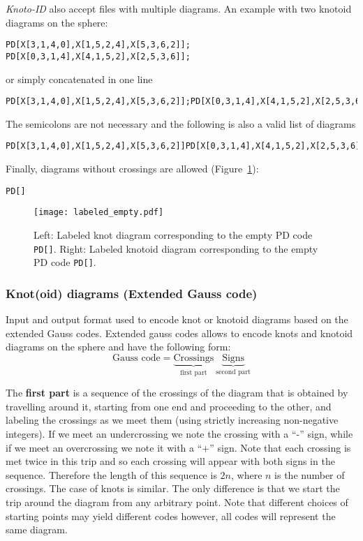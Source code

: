 {\it Knoto-ID} also accept files with multiple diagrams. An example with two knotoid diagrams on the sphere:
\begin{lstlisting}
PD[X[3,1,4,0],X[1,5,2,4],X[5,3,6,2]];
PD[X[0,3,1,4],X[4,1,5,2],X[2,5,3,6]];
\end{lstlisting}
or simply concatenated in one line
\begin{lstlisting}
PD[X[3,1,4,0],X[1,5,2,4],X[5,3,6,2]];PD[X[0,3,1,4],X[4,1,5,2],X[2,5,3,6]];
\end{lstlisting}

The semicolons are not necessary and the following is also a valid list of diagrams
\begin{lstlisting}
PD[X[3,1,4,0],X[1,5,2,4],X[5,3,6,2]]PD[X[0,3,1,4],X[4,1,5,2],X[2,5,3,6]]
\end{lstlisting}

Finally, diagrams without crossings are allowed (Figure~\ref{fig:labempty}):
\begin{lstlisting}
PD[]
\end{lstlisting}

\begin{figure}[t]
\centering
\texttt{[image: labeled\_empty.pdf]}
\caption{Left: Labeled knot diagram corresponding to the empty PD code \lstinline{PD[]}. Right: Labeled knotoid diagram corresponding to the empty PD code \lstinline{PD[]}.}\label{fig:labempty}
\end{figure}

\subsubsection{\label{sec:format:gauss}Knot(oid) diagrams (Extended Gauss code)}
Input and output format used to encode knot or knotoid diagrams based on the  extended Gauss codes\cite{gabrov,guka}. Extended gauss codes allows to encode knots and knotoid diagrams on the sphere and have the following form:
\[
\mbox{Gauss code} = \underbrace{\mbox{Crossings}}_{\mbox{first part}} \ \underbrace{\mbox{Signs}}_{\mbox{second part}}
\]

The {\bf first part} is a sequence of the crossings  of the diagram that is obtained by travelling around it, starting from one end and proceeding to the other, and labeling the crossings as we meet them (using strictly increasing non-negative integers). If we meet an undercrossing we note the crossing with a ``-'' sign, while if we meet an overcrossing we note it with a ``+'' sign. Note that each crossing is met twice in this trip and so each crossing will appear with both signs in the sequence. Therefore the length of this sequence is $2n$, where $n$ is the number of crossings. The case of knots is similar. The only difference is that we start the trip around the diagram from any arbitrary point. Note that different choices of starting points may yield different codes however, all codes will represent the same diagram. \\

